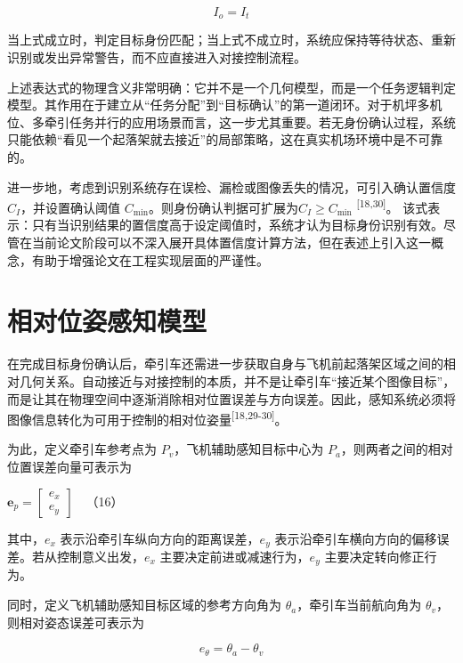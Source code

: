 \begin{equation}
I_{o} = I_{t}
\tag{15}
\label{eq:15}
\end{equation}

当上式成立时，判定目标身份匹配；当上式不成立时，系统应保持等待状态、重新识别或发出异常警告，而不应直接进入对接控制流程。

上述表达式的物理含义非常明确：它并不是一个几何模型，而是一个任务逻辑判定模型。其作用在于建立从``任务分配''到``目标确认''的第一道闭环。对于机坪多机位、多牵引任务并行的应用场景而言，这一步尤其重要。若无身份确认过程，系统只能依赖``看见一个起落架就去接近''的局部策略，这在真实机场环境中是不可靠的。

进一步地，考虑到识别系统存在误检、漏检或图像丢失的情况，可引入确认置信度
\(C_{I}\)，并设置确认阈值
\(C_{\min}\)。则身份确认判据可扩展为\(C_{I} \geq C_{\min}\)
\textsuperscript{[18,30]}。\(
\)
该式表示：只有当识别结果的置信度高于设定阈值时，系统才认为目标身份识别有效。尽管在当前论文阶段可以不深入展开具体置信度计算方法，但在表述上引入这一概念，有助于增强论文在工程实现层面的严谨性。

\section{相对位姿感知模型}

在完成目标身份确认后，牵引车还需进一步获取自身与飞机前起落架区域之间的相对几何关系。自动接近与对接控制的本质，并不是让牵引车``接近某个图像目标''，而是让其在物理空间中逐渐消除相对位置误差与方向误差。因此，感知系统必须将图像信息转化为可用于控制的相对位姿量\textsuperscript{[18,29-30]}。

为此，定义牵引车参考点为 \(P_{v}\)，飞机辅助感知目标中心为
\(P_{a}\)，则两者之间的相对位置误差向量可表示为

\(\mathbf{e}_{p} = \left\lbrack \begin{array}{r}
e_{x} \\
e_{y}
\end{array} \right\rbrack\ \ \ \) （16）

其中，\(e_{x}\) 表示沿牵引车纵向方向的距离误差，\(e_{y}\)
表示沿牵引车横向方向的偏移误差。若从控制意义出发，\(e_{x}\)
主要决定前进或减速行为，\(e_{y}\) 主要决定转向修正行为。

同时，定义飞机辅助感知目标区域的参考方向角为
\(\theta_{a}\)，牵引车当前航向角为
\(\theta_{v}\)，则相对姿态误差可表示为

\begin{equation}
e_{\theta} = \theta_{a} - \theta_{v}
\tag{17}
\label{eq:17}
\end{equation}

